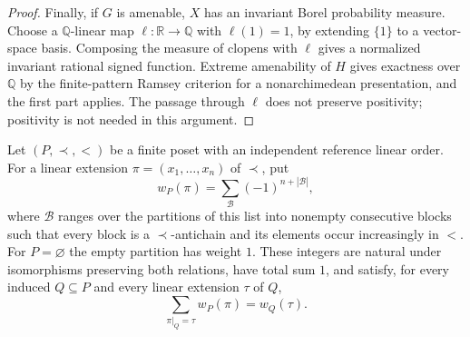\begin{proof}
Finally, if $G$ is amenable, $X$ has an invariant Borel probability
measure. Choose a $\mathbb Q$-linear map
$\ell:\mathbb R\to\mathbb Q$ with $\ell(1)=1$, by extending
$\{1\}$ to a vector-space basis. Composing the measure of clopens
with $\ell$ gives a normalized invariant rational signed function.
Extreme amenability of $H$ gives exactness over $\mathbb Q$ by the
finite-pattern Ramsey criterion for a nonarchimedean presentation,
and the first part applies. The passage through $\ell$ does not
preserve positivity; positivity is not needed in this argument.
\end{proof}

\begin{lemma}
\label{A:poset-weights}
Let $(P,\prec,<)$ be a finite poset with an independent reference
linear order. For a linear extension
$\pi=(x_1,\ldots,x_n)$ of $\prec$, put
\[
 w_P(\pi)=\sum_{\mathcal B}(-1)^{n+|\mathcal B|},
\]
where $\mathcal B$ ranges over the partitions of this list into
nonempty consecutive blocks such that every block is a
$\prec$-antichain and its elements occur increasingly in $<$.
For $P=\varnothing$ the empty partition has weight $1$. These
integers are natural under isomorphisms preserving both relations,
have total sum $1$, and satisfy, for every induced $Q\subseteq P$
and every linear extension $\tau$ of $Q$,
\[
 \sum_{\pi|_Q=\tau}w_P(\pi)=w_Q(\tau).
\]
\end{lemma}
